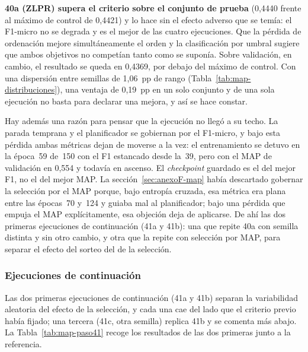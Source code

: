 \textbf{40a (ZLPR) supera el criterio sobre el conjunto de prueba} (0{,}4440 frente al máximo de control de 0{,}4421) y lo hace sin el efecto adverso que se temía: el F1-micro no se degrada y es el mejor de las cuatro ejecuciones. Que la pérdida de ordenación mejore simultáneamente el orden y la clasificación por umbral sugiere que ambos objetivos no competían tanto como se suponía. Sobre validación, en cambio, el resultado se queda en 0{,}4369, por debajo del máximo de control. Con una dispersión entre semillas de 1,06~pp de rango (Tabla~\ref{tab:map-distribuciones}), una ventaja de 0{,}19~pp en un solo conjunto y de una sola ejecución no basta para declarar una mejora, y así se hace constar.

Hay además una razón para pensar que la ejecución no llegó a su techo. La parada temprana y el planificador se gobiernan por el F1-micro, y bajo esta pérdida ambas métricas dejan de moverse a la vez: el entrenamiento se detuvo en la época~59 de~150 con el F1 estancado desde la~39, pero con el MAP de validación en 0{,}554 y todavía en ascenso. El \emph{checkpoint} guardado es el del mejor F1, no el del mejor MAP. La sección~\ref{sec:anexoF-map} había descartado gobernar la selección por el MAP porque, bajo entropía cruzada, esa métrica era plana entre las épocas~70 y~124 y guiaba mal al planificador; bajo una pérdida que empuja el MAP explícitamente, esa objeción deja de aplicarse. De ahí las dos primeras ejecuciones de continuación (41a y 41b): una que repite 40a con semilla distinta y sin otro cambio, y otra que la repite con selección por MAP, para separar el efecto del sorteo del de la selección.

\subsubsection*{Ejecuciones de continuación}

Las dos primeras ejecuciones de continuación (41a y 41b) separan la variabilidad aleatoria del efecto de la selección, y cada una cae del lado que el criterio previo había fijado; una tercera (41c, otra semilla) replica 41b y se comenta más abajo. La Tabla~\ref{tab:map-paso41} recoge los resultados de las dos primeras junto a la referencia.

